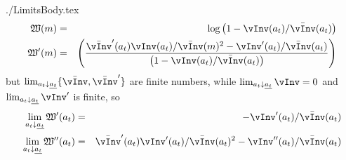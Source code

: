 \newcommand{\textname}{./Appendices/Limits}\documentclass{\econtex} \newcommand{\Mma}{{\it Mathematica}}
\begin{document}
 \large 
\begin{verbatimwrite}{./LimitsBody.tex}
\newcommand{\vPF}{\bar{\vInv}}
\newcommand{\cPF}{\bar{\cFunc}}
\newcommand{\W}{\mathfrak{W}}
\newcommand{\at}{a_{t}}
\newcommand{\atDown}{\lim_{\at \downarrow \underline{\at}}}
  \begin{eqnarray}
    \W(m) & = & \log \left(1-\vInv(\at)/\vPF(\at)\right) 
\\ \W^{\prime}(m) & = & \left(\frac{\vPF^{\prime}(\at)\vInv(\at)/\vPF(m)^2-\vInv^{\prime}(\at)/\vPF(\at)}{\left(1-\vInv(\at)/\vPF(\at)\right) }\right)
  \end{eqnarray}
but $\atDown \{\vPF,\vPF^{\prime}\}$ are finite numbers, while $\atDown \vInv = 0$ and $\atDown \vInv^{\prime}$ is finite, so
  \begin{eqnarray}
   \atDown \W^{\prime}(\at) & = & -\vInv^{\prime}(\at)/\vPF(\at)
\\ \atDown \W^{\prime\prime}(\at) & = & \vPF^{\prime}(\at)\vInv^{\prime}(\at)/\vPF(\at)^{2}-\vInv^{\prime\prime}(\at)/\vPF(\at  )
  \end{eqnarray}


\end{verbatimwrite}



\end{document}

